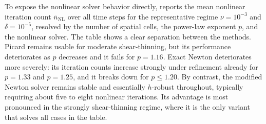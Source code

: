 \documentclass[DIV=16]{scrartcl}
\newcommand{\reg}{\delta}
\newcommand{\pn}{p}
\begin{document}
To expose the nonlinear solver behavior directly, 
reports the mean nonlinear iteration count $\overline{n}_{\mathrm{NL}}$ over all
time steps for the representative regime $\nu=10^{-3}$ and $\reg=10^{-5}$,
resolved by the number of spatial cells, the power-law exponent $\pn$, and the
nonlinear solver. The table shows a clear separation between the methods. Picard
remains usable for moderate shear-thinning, but its performance deteriorates as
$\pn$ decreases and it fails for $\pn=1.16$. Exact Newton deteriorates more
severely: its iteration counts increase strongly under refinement already for
$\pn=1.33$ and $\pn=1.25$, and it breaks down for $\pn\le 1.20$. By contrast,
the modified Newton solver remains stable and essentially $h$-robust throughout,
typically requiring about five to eight nonlinear iterations. Its advantage is
most pronounced in the strongly shear-thinning regime, where it is the only
variant that solves all cases in the table.
\end{document}
